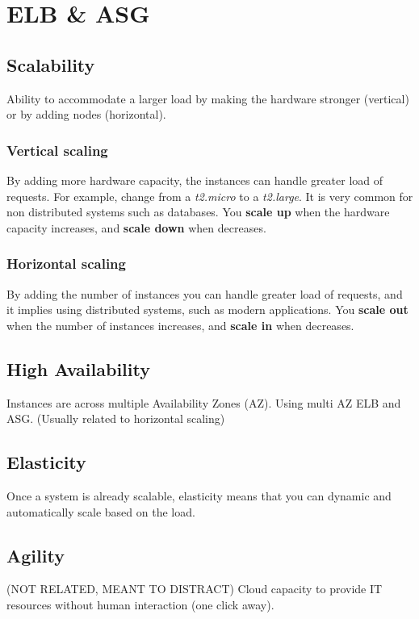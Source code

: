 \section{ELB \& ASG}


\subsection{Scalability}
Ability to accommodate a larger load by making the hardware stronger (vertical) or by adding nodes (horizontal).

\subsubsection{Vertical scaling}
By adding more hardware capacity, the instances can handle greater load of requests. For example, change from a \textit{t2.micro} to a \textit{t2.large}. It is very common for non distributed systems such as databases.
You \textbf{scale up} when the hardware capacity increases, and \textbf{scale down} when decreases.

\subsubsection{Horizontal scaling}
By adding the number of instances you can handle greater load of requests, and it implies using distributed systems, such as modern applications.
You \textbf{scale out} when the number of instances increases, and \textbf{scale in} when decreases.

\subsection{High Availability}
Instances are across multiple Availability Zones (AZ). Using multi AZ ELB and ASG. (Usually related to horizontal scaling)

\subsection{Elasticity}
Once a system is already scalable, elasticity means that you can dynamic and automatically scale based on the load.

\subsection{Agility}
(NOT RELATED, MEANT TO DISTRACT) Cloud capacity to provide IT resources without human interaction (one click away).

